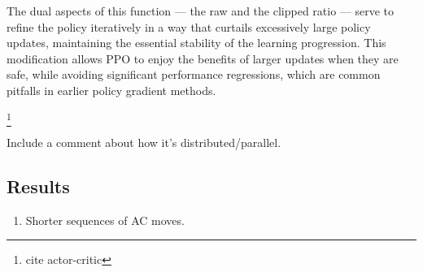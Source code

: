The dual aspects of this function — the raw and the clipped ratio — serve to refine the policy iteratively in a way that curtails excessively large policy updates, maintaining the essential stability of the learning progression. This modification allows PPO to enjoy the benefits of larger updates when they are safe, while avoiding significant performance regressions, which are common pitfalls in earlier policy gradient methods. 



\footnote{cite actor-critic}

Include a comment about how it's distributed/parallel.

\subsection{Results}

\begin{enumerate}
\item Shorter sequences of AC moves. 
\end{enumerate}
